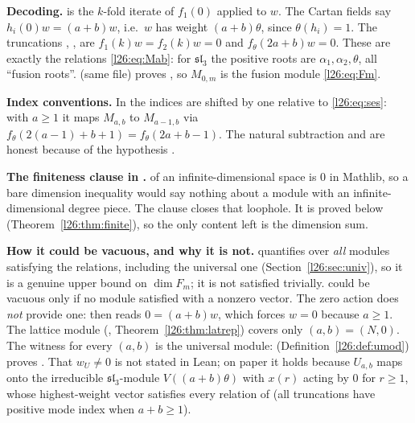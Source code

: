 \begin{dictionary}
\textbf{Decoding.}  is the $k$-fold iterate of $f_1(0)$ applied to $w$. The Cartan fields say
$h_i(0)w=(a+b)w$, i.e.\ $w$ has weight $(a+b)\theta$, since $\theta(h_i)=1$. The truncations ,
,  are $f_1(k)w=f_2(k)w=0$ and $f_\theta(2a+b)w=0$. These are exactly the relations
\eqref{l26:eq:Mab}: for $\mathfrak{sl}_3$ the positive roots are $\alpha_1,\alpha_2,\theta$, all ``fusion roots''.
 (same file) proves , so $M_{0,m}$ is the fusion
module \eqref{l26:eq:Fm}.

\textbf{Index conventions.} In  the indices are shifted by one relative to
\eqref{l26:eq:ses}: with $a\ge1$ it maps $M_{a,b}$ to $M_{a-1,b}$ via $f_\theta(2(a-1)+b+1)=f_\theta(2a+b-1)$. The natural
subtraction  and  are honest because of the hypothesis .

\textbf{The finiteness clause in .}  of an infinite-dimensional space is $0$
in Mathlib, so a bare dimension inequality would say nothing about a module with an infinite-dimensional degree piece.
The clause  closes that loophole. It is proved below
(Theorem~\ref{l26:thm:finite}), so the only content left is the dimension sum.

\textbf{How it could be vacuous, and why it is not.}  quantifies over \emph{all} modules
satisfying the relations, including the universal one (Section~\ref{l26:sec:univ}), so it is a genuine upper bound on
$\dim F_m$; it is not satisfied trivially.  could be vacuous only if no module satisfied
 with a nonzero vector. The zero action does \emph{not} provide one:  then reads
$0=(a+b)w$, which forces $w=0$ because $a\ge1$. The lattice module (, Theorem~\ref{l26:thm:latrep})
covers only $(a,b)=(N,0)$. The witness for every $(a,b)$ is the universal module: 
(Definition~\ref{l26:def:umod}) proves . That $w_U\neq0$ is not stated in Lean; on
paper it holds because $U_{a,b}$ maps onto the irreducible $\mathfrak{sl}_3$-module $V((a+b)\theta)$ with $x(r)$ acting by $0$ for
$r\ge1$, whose highest-weight vector satisfies every relation of  (all truncations have positive mode index when
$a+b\ge1$).
\end{dictionary}

